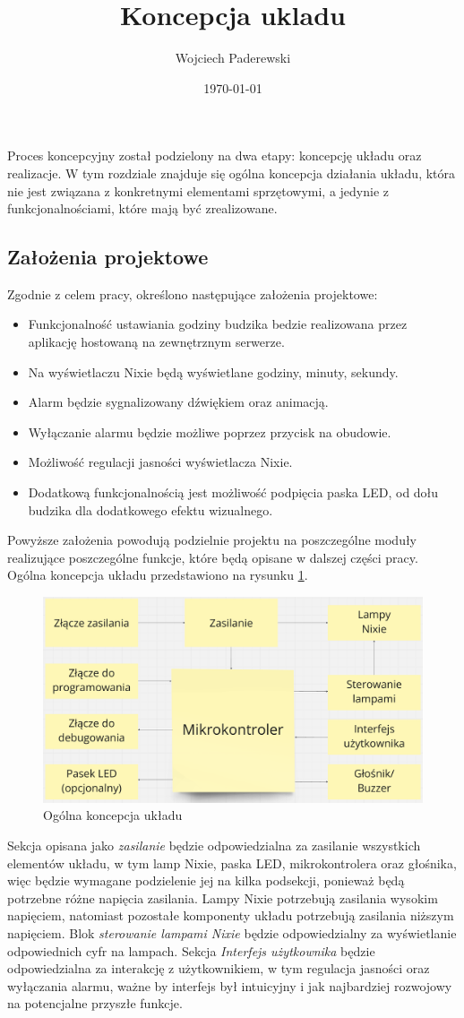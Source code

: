 \documentclass[../main.tex]{subfiles}
\author{Wojciech Paderewski}
\date{\today}
\title{Koncepcja ukladu}
\begin{document}
 Proces koncepcyjny został podzielony na dwa etapy: koncepcję układu oraz realizacje. W tym rozdziale znajduje się ogólna koncepcja 
 działania układu, która nie jest związana z konkretnymi elementami sprzętowymi, a jedynie z funkcjonalnościami, które mają być zrealizowane.
 \subsection{Założenia projektowe}
Zgodnie z celem pracy, określono następujące założenia projektowe:
\begin{itemize}
    \item Funkcjonalność ustawiania godziny budzika bedzie realizowana przez aplikację hostowaną na zewnętrznym serwerze.
    \item Na wyświetlaczu Nixie będą wyświetlane godziny, minuty, sekundy.
    \item Alarm będzie sygnalizowany dźwiękiem oraz animacją.
    \item Wyłączanie alarmu będzie możliwe poprzez przycisk na obudowie.
    \item Możliwość regulacji jasności wyświetlacza Nixie.
    \item Dodatkową funkcjonalnością jest możliwość podpięcia paska LED, od dołu budzika dla dodatkowego efektu wizualnego.
\end{itemize}
Powyższe założenia powodują podzielnie projektu na poszczególne moduły realizujące poszczególne funkcje, które będą opisane w dalszej części pracy.
Ogólna koncepcja układu przedstawiono na rysunku \ref{fig:concept}.
\begin{figure}[H]
    \centering
    \includegraphics[width=1\textwidth]{schemat_og.png}
    \caption{Ogólna koncepcja układu}
    \label{fig:concept}
\end{figure}
Sekcja opisana jako \textit{zasilanie} będzie odpowiedzialna za zasilanie wszystkich elementów układu, w tym lamp Nixie, paska LED, mikrokontrolera oraz głośnika,
więc będzie wymagane podzielenie jej na kilka podsekcji, ponieważ będą potrzebne różne napięcia zasilania. Lampy Nixie potrzebują zasilania wysokim napięciem,
natomiast pozostałe komponenty układu potrzebują zasilania niższym napięciem. Blok \textit{sterowanie lampami Nixie} będzie odpowiedzialny za wyświetlanie odpowiednich cyfr na lampach.
Sekcja \textit{Interfejs użytkownika} będzie odpowiedzialna za interakcję z użytkownikiem, w tym regulacja jasności oraz wyłączania alarmu, ważne by interfejs był 
intuicyjny i jak najbardziej rozwojowy na potencjalne przyszłe funkcje.
\end{document}
